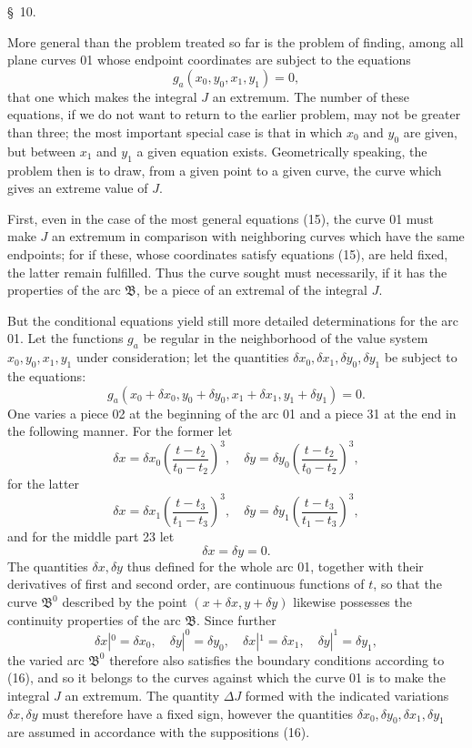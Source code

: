 \documentclass[11pt,a4paper,leqno]{article}
\begin{document}
\begin{center}{\large \S~10.}\end{center}

More general than the problem treated so far is the problem of finding, among all plane curves 01 whose endpoint coordinates are subject to the equations
\begin{equation}\tag{15}
g_a(x_0,y_0,x_1,y_1)=0,
\end{equation}
that one which makes the integral $J$ an extremum. The number of these equations, if we do not want to return to the earlier problem, may not be greater than three; the most important special case is that in which $x_0$ and $y_0$ are given, but between $x_1$ and $y_1$ a given equation exists. Geometrically speaking, the problem then is to draw, from a given point to a given curve, the curve which gives an extreme value of $J$.

First, even in the case of the most general equations (15), the curve 01 must make $J$ an extremum in comparison with neighboring curves which have the same endpoints; for if these, whose coordinates satisfy equations (15), are held fixed, the latter remain fulfilled. Thus the curve sought must necessarily, if it has the properties of the arc $\mathfrak{B}$, be a piece of an extremal of the integral $J$.

But the conditional equations yield still more detailed determinations for the arc 01. Let the functions $g_a$ be regular in the neighborhood of the value system $x_0,y_0,x_1,y_1$ under consideration; let the quantities $\delta x_0,\delta x_1,\delta y_0,\delta y_1$ be subject to the equations:
\begin{equation}\tag{16}
g_a(x_0+\delta x_0,y_0+\delta y_0,x_1+\delta x_1,y_1+\delta y_1)=0.
\end{equation}
One varies a piece 02 at the beginning of the arc 01 and a piece 31 at the end in the following manner. For the former let
\[
\delta x=\delta x_0\left(\frac{t-t_2}{t_0-t_2}\right)^3,
\quad
\delta y=\delta y_0\left(\frac{t-t_2}{t_0-t_2}\right)^3,
\]
for the latter
\[
\delta x=\delta x_1\left(\frac{t-t_3}{t_1-t_3}\right)^3,
\quad
\delta y=\delta y_1\left(\frac{t-t_3}{t_1-t_3}\right)^3,
\]
and for the middle part 23 let
\[
\delta x=\delta y=0.
\]
The quantities $\delta x,\delta y$ thus defined for the whole arc 01, together with their derivatives of first and second order, are continuous functions of $t$, so that the curve $\mathfrak{B}^0$ described by the point $(x+\delta x,y+\delta y)$ likewise possesses the continuity properties of the arc $\mathfrak{B}$. Since further
\[
\delta x|^0=\delta x_0,\quad \delta y|^0=\delta y_0,\quad
\delta x|^1=\delta x_1,\quad \delta y|^1=\delta y_1,
\]
the varied arc $\mathfrak{B}^0$ therefore also satisfies the boundary conditions according to (16), and so it belongs to the curves against which the curve 01 is to make the integral $J$ an extremum. The quantity $\Delta J$ formed with the indicated variations $\delta x,\delta y$ must therefore have a fixed sign, however the quantities $\delta x_0,\delta y_0,\delta x_1,\delta y_1$ are assumed in accordance with the suppositions (16).
\end{document}
